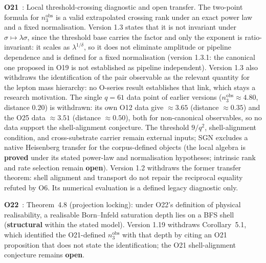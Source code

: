 \documentclass[11pt,a4paper]{article}
\newcommand{\sproved}{\textcolor{cproved}{\textbf{proved}}}
\newcommand{\sstruct}{\textcolor{cstruct}{\textbf{structural}}}
\newcommand{\sopen}{\textcolor{copen}{\textbf{open}}}
\begin{document}
    \textbf{O21}~\cite{Beau2026a25}: Local threshold-crossing diagnostic and open transfer.
    The two-point formula for $n_3^{\mathrm{obs}}$ is a valid extrapolated crossing rank under
    an exact power law and a fixed normalisation.  Version 1.3 states that it is not invariant under
    $\sigma\mapsto\lambda\sigma$, since the threshold base carries the factor and only the exponent is
    ratio-invariant: it scales as $\lambda^{1/\delta}$, so it does not eliminate amplitude or pipeline
    dependence and is defined for a fixed normalisation (version 1.3.1: the canonical one proposed in
    O19 is not established as pipeline independent).
    Version 1.3 also withdraws the identification of the pair observable as the relevant quantity for the
    lepton mass hierarchy: no O-series result establishes that link, which stays a research motivation.
    The single $q=61$ data point of earlier versions ($n_3^{\mathrm{obs}}\approx4.80$, distance $0.20$) is
    withdrawn: its own O12 data give $\approx3.65$ (distance $\approx0.35$) and the O25 data
    $\approx3.51$ (distance $\approx0.50$), both for non-canonical observables, so no data support the
    shell-alignment conjecture.  The threshold $9/q^2$, shell-alignment condition, and
    cross-substrate carrier remain external inputs; SGN excludes a native Heisenberg transfer
    for the corpus-defined objects (the local algebra is \sproved{} under its stated power-law and
    normalisation hypotheses; intrinsic rank and rate selection remain \sopen).
    Version 1.2 withdraws the former transfer theorem: shell alignment and transport do not repair the
    reciprocal equality refuted by O6. Its numerical evaluation is a defined legacy diagnostic only.

    \textbf{O22}~\cite{Beau2026a26}: Theorem~4.8 (projection locking): under O22's definition of physical
    realisability, a realisable Born--Infeld saturation depth lies on a BFS shell
    (\sstruct{} within the stated model).
    Version 1.19 withdraws Corollary~5.1, which identified the O21-defined $n_3^{\mathrm{obs}}$ with that
    depth by citing an O21 proposition that does not state the identification; the O21 shell-alignment
    conjecture remains \sopen.
\end{document}
